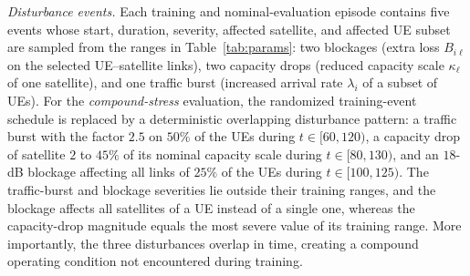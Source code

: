 \documentclass[journal]{IEEEtran}
\begin{document}
\emph{Disturbance events.} Each training and nominal-evaluation episode
contains five events whose start, duration, severity, affected satellite,
and affected UE subset are sampled from the ranges in Table~\ref{tab:params}:
two blockages (extra loss $B_{i\ell}$ on the selected UE--satellite links),
two capacity drops (reduced capacity scale $\kappa_\ell$ of one satellite),
and one traffic burst (increased arrival rate $\lambda_i$ of a subset of UEs).
For the \emph{compound-stress} evaluation, the randomized training-event
schedule is replaced by a deterministic overlapping disturbance pattern: a
traffic burst with the factor $2.5$ on $50\%$ of the UEs during
$t\in[60,120)$, a capacity drop of satellite $2$ to $45\%$ of its nominal
capacity scale during $t\in[80,130)$, and an $18$-dB blockage affecting all
links of $25\%$ of the UEs during $t\in[100,125)$. The traffic-burst and
blockage severities lie outside their training ranges, and the blockage
affects all satellites of a UE instead of a single one, whereas the
capacity-drop magnitude equals the most severe value of its training range.
More importantly, the three disturbances overlap in time, creating a
compound operating condition not encountered during training.
\end{document}
